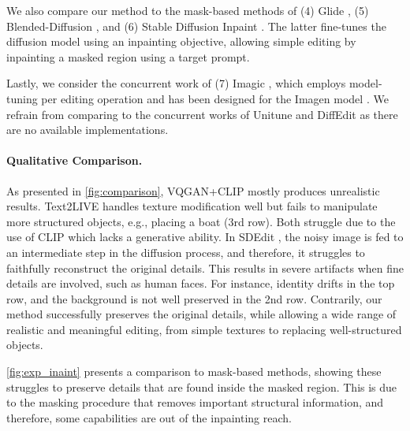 We also compare our method to the mask-based methods of (4) Glide \cite{nichol2021glide}, (5) Blended-Diffusion \cite{avrahami2022blended}, and (6) Stable Diffusion Inpaint \cite{rombach2021highresolution}. The latter fine-tunes the diffusion model using an inpainting objective, allowing simple editing by inpainting a masked region using a target prompt.



Lastly, we consider the concurrent work of (7) Imagic \cite{Kawar2022ImagicTR}, which employs model-tuning per editing operation and has been designed for the Imagen model \cite{saharia2022photorealistic}. 
We refrain from comparing to the concurrent works of Unitune \cite{valevski2022unitune} and DiffEdit \cite{couairon2022diffedit} as there are no available implementations.







\vspace{-0.3cm}
\paragraph{Qualitative Comparison.}
As presented in \cref{fig:comparison}, VQGAN+CLIP \cite{katherine2021vqganclip} mostly produces unrealistic results. Text2LIVE \cite{bar2022text2live} handles texture modification well but fails to manipulate more structured objects, e.g., placing a boat (3rd row). 
Both struggle due to the use of CLIP \cite{radford2021learning} which lacks a generative ability.
In SDEdit \cite{meng2021sdedit}, the noisy image is fed to an intermediate step in the diffusion process, and therefore, it struggles to faithfully reconstruct the original details. This results in severe artifacts when fine details are involved, such as human faces. For instance, identity drifts in the top row, and the background is not well preserved in the 2nd row.
Contrarily, our method successfully preserves the original details, while allowing a wide range of realistic and meaningful editing, from simple textures to replacing well-structured objects.



\cref{fig:exp_inaint} presents a comparison to mask-based methods, showing these struggles to preserve details that are found inside the masked region. This is due to the masking procedure that removes important structural information, and therefore, some capabilities are out of the inpainting reach.



